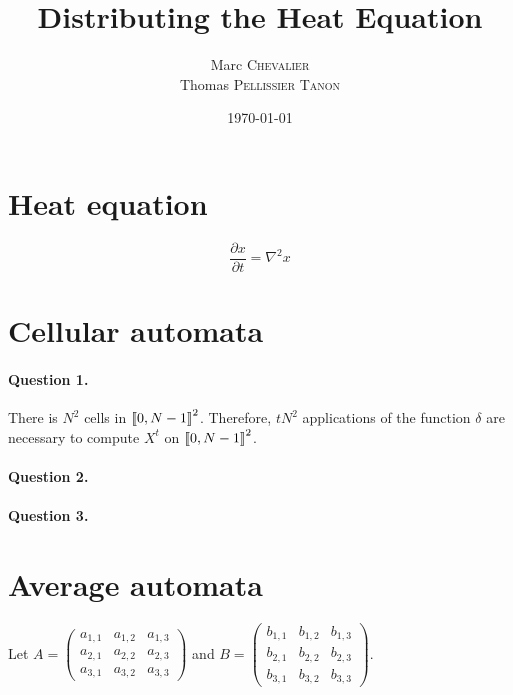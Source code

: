 

\author{
    Marc \textsc{Chevalier}\\
    Thomas \textsc{Pellissier Tanon}
}
\date{\today}
\title{Distributing the Heat Equation}


\maketitle

\section{Heat equation}

$$
    \frac{\partial x}{\partial t}=\nabla^2 x
$$

\section{Cellular automata}

\paragraph{Question 1.} There is $N^2$ cells in $\left\llbracket 0,N-1 \right\rrbracket^2$. Therefore, $tN^2$ applications of the function $\delta$ are necessary to compute $X^t$ on $\left\llbracket 0,N-1 \right\rrbracket^2$.

\paragraph{Question 2.} 

\paragraph{Question 3.} 

\section{Average automata}

Let $A=
        \left(
            \begin{matrix}
                a_{1,1} & a_{1,2} & a_{1,3} \\ 
                a_{2,1} & a_{2,2} & a_{2,3} \\ 
                a_{3,1} & a_{3,2} & a_{3,3}
            \end{matrix}
        \right)$
         and 
    $B = 
        \left(
            \begin{matrix}
                b_{1,1} & b_{1,2} & b_{1,3} \\ 
                b_{2,1} & b_{2,2} & b_{2,3} \\ 
                b_{3,1} & b_{3,2} & b_{3,3}
            \end{matrix}
        \right)$.

